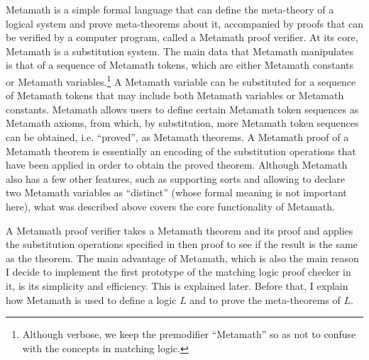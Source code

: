 \documentclass[11pt]{article}
\begin{document}
Metamath is a simple formal language that can define the meta-theory of a 
logical system and prove meta-theorems about it, accompanied by proofs that can 
be verified by a computer program, called a {Metamath proof verifier}. 
At its core, Metamath is a substitution system. 
The main data that Metamath manipulates is that of a sequence of Metamath tokens, which are either Metamath constants or Metamath variables.\footnote{Although verbose, we keep the premodifier ``Metamath'' so as not to confuse with the concepts in matching logic.} 
A Metamath variable can be substituted for a sequence of Metamath tokens that may include both Metamath variables or Metamath constants. 
Metamath allows users to define certain Metamath token sequences as Metamath axioms,
from which, by substitution, more Metamath token sequences can be obtained, i.e. ``proved'', as Metamath theorems. 
A Metamath proof of a Metamath theorem is essentially an encoding of the substitution operations that have been applied in order to obtain the proved theorem. 
Although Metamath also has a few other features,
such as supporting sorts and 
allowing to declare two Metamath variables as ``distinct'' (whose formal meaning is not important here),
what was described above covers the core functionality of Metamath. 

A Metamath proof verifier takes a Metamath theorem and its proof and applies the substitution operations specified in then proof to see if the result is the same as the theorem. 
The main advantage of Metamath, which is also the main reason I decide to implement the first prototype of the matching logic proof checker in it, 
is its simplicity and efficiency. 
This is explained later. 
Before that, I explain how Metamath is used to define a logic $L$
and to prove the meta-theorems of $L$.
\end{document}
